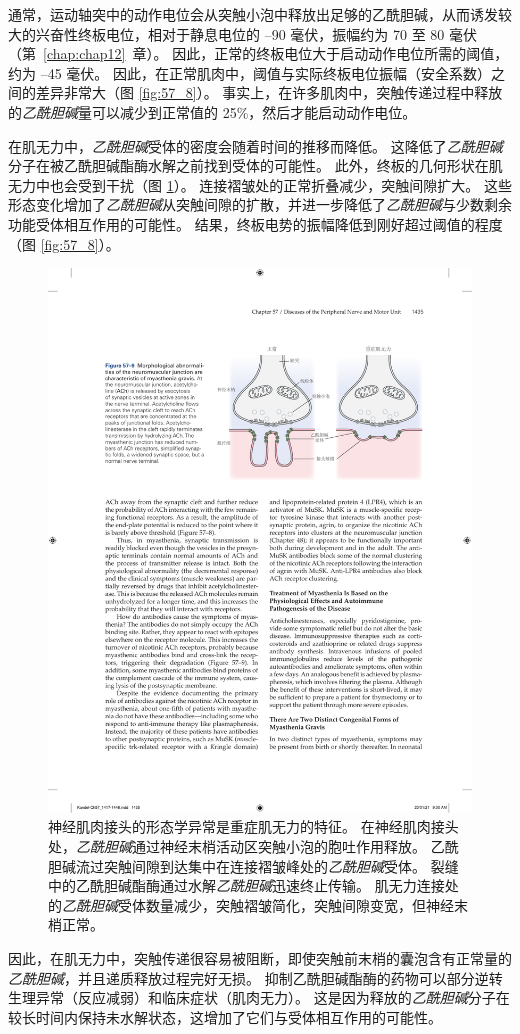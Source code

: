 通常，运动轴突中的动作电位会从突触小泡中释放出足够的乙酰胆碱，从而诱发较大的兴奋性终板电位，相对于静息电位的 –90 毫伏，振幅约为 70 至 80 毫伏（第~\ref{chap:chap12}~章）。
因此，正常的终板电位大于启动动作电位所需的阈值，约为 –45 毫伏。
因此，在正常肌肉中，阈值与实际终板电位振幅（安全系数）之间的差异非常大（图 \ref{fig:57_8}）。
事实上，在许多肌肉中，突触传递过程中释放的\textit{乙酰胆碱}量可以减少到正常值的 25\%，然后才能启动动作电位。


在肌无力中，\textit{乙酰胆碱}受体的密度会随着时间的推移而降低。
这降低了\textit{乙酰胆碱}分子在被乙酰胆碱酯酶水解之前找到受体的可能性。
此外，终板的几何形状在肌无力中也会受到干扰（图 \ref{fig:57_9}）。
连接褶皱处的正常折叠减少，突触间隙扩大。
这些形态变化增加了\textit{乙酰胆碱}从突触间隙的扩散，并进一步降低了\textit{乙酰胆碱}与少数剩余功能受体相互作用的可能性。
结果，终板电势的振幅降低到刚好超过阈值的程度（图 \ref{fig:57_8}）。


\begin{figure}[htbp]
	\centering
	\includegraphics[width=0.65\linewidth]{chap57/fig_57_9}
	\caption{神经肌肉接头的形态学异常是重症肌无力的特征。
		在神经肌肉接头处，\textit{乙酰胆碱}通过神经末梢活动区突触小泡的胞吐作用释放。
		乙酰胆碱流过突触间隙到达集中在连接褶皱峰处的\textit{乙酰胆碱}受体。
		裂缝中的乙酰胆碱酯酶通过水解\textit{乙酰胆碱}迅速终止传输。
		肌无力连接处的\textit{乙酰胆碱}受体数量减少，突触褶皱简化，突触间隙变宽，但神经末梢正常。}
	\label{fig:57_9}
\end{figure}


因此，在肌无力中，突触传递很容易被阻断，即使突触前末梢的囊泡含有正常量的\textit{乙酰胆碱}，并且递质释放过程完好无损。
抑制乙酰胆碱酯酶的药物可以部分逆转生理异常（反应减弱）和临床症状（肌肉无力）。
这是因为释放的\textit{乙酰胆碱}分子在较长时间内保持未水解状态，这增加了它们与受体相互作用的可能性。


